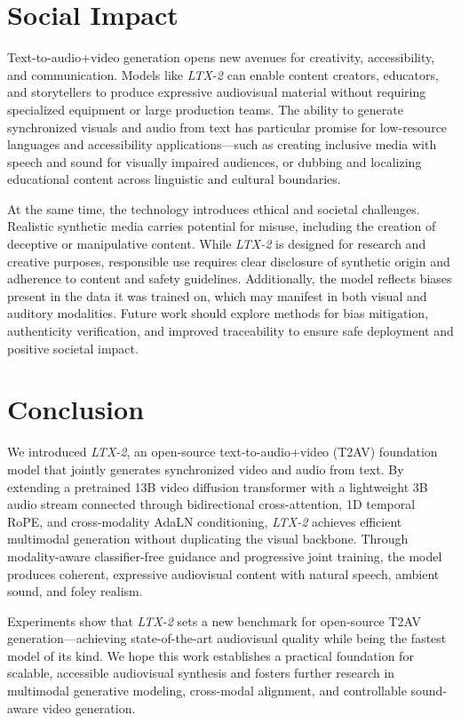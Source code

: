 \documentclass{article}
\begin{document}
\section{Social Impact}

Text-to-audio+video generation opens new avenues for creativity, accessibility, and communication. Models like \textit{LTX-2} can enable content creators, educators, and storytellers to produce expressive audiovisual material without requiring specialized equipment or large production teams. The ability to generate synchronized visuals and audio from text has particular promise for low-resource languages and accessibility applications—such as creating inclusive media with speech and sound for visually impaired audiences, or dubbing and localizing educational content across linguistic and cultural boundaries.

At the same time, the technology introduces ethical and societal challenges. Realistic synthetic media carries potential for misuse, including the creation of deceptive or manipulative content. While \textit{LTX-2} is designed for research and creative purposes, responsible use requires clear disclosure of synthetic origin and adherence to content and safety guidelines. Additionally, the model reflects biases present in the data it was trained on, which may manifest in both visual and auditory modalities. Future work should explore methods for bias mitigation, authenticity verification, and improved traceability to ensure safe deployment and positive societal impact.

\section{Conclusion}

We introduced \textit{LTX-2}, an open-source text-to-audio+video (T2AV) foundation model that jointly generates synchronized video and audio from text.
By extending a pretrained 13B video diffusion transformer with a lightweight 3B audio stream connected through bidirectional cross-attention, 1D temporal RoPE, and cross-modality AdaLN conditioning, \textit{LTX-2} achieves efficient multimodal generation without duplicating the visual backbone.
Through modality-aware classifier-free guidance and progressive joint training, the model produces coherent, expressive audiovisual content with natural speech, ambient sound, and foley realism.

Experiments show that \textit{LTX-2} sets a new benchmark for open-source T2AV generation—achieving state-of-the-art audiovisual quality while being the fastest model of its kind.
We hope this work establishes a practical foundation for scalable, accessible audiovisual synthesis and fosters further research in multimodal generative modeling, cross-modal alignment, and controllable sound-aware video generation.
\end{document}
